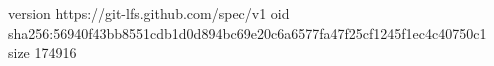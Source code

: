 version https://git-lfs.github.com/spec/v1
oid sha256:56940f43bb8551cdb1d0d894bc69e20c6a6577fa47f25cf1245f1ec4c40750c1
size 174916
